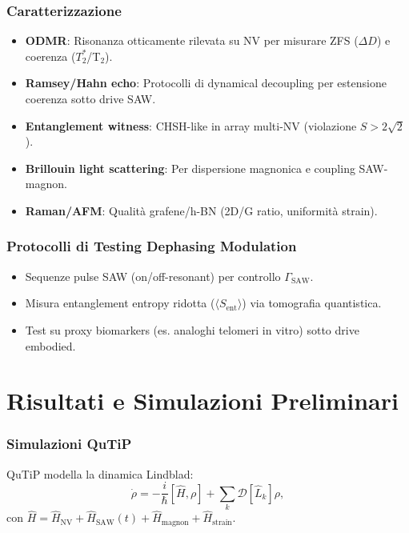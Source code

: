 \documentclass[12pt,a4paper]{article}
\begin{document}
\subsubsection{Caratterizzazione}

\begin{itemize}
    \item \textbf{ODMR}: Risonanza otticamente rilevata su NV per misurare ZFS ($\Delta D$) e coerenza ($T_2^*$/T$_2$).
    \item \textbf{Ramsey/Hahn echo}: Protocolli di dynamical decoupling per estensione coerenza sotto drive SAW.
    \item \textbf{Entanglement witness}: CHSH-like in array multi-NV (violazione $S > 2\sqrt{2}$).
    \item \textbf{Brillouin light scattering}: Per dispersione magnonica e coupling SAW-magnon.
    \item \textbf{Raman/AFM}: Qualità grafene/h-BN (2D/G ratio, uniformità strain).
\end{itemize}

\subsubsection{Protocolli di Testing Dephasing Modulation}

\begin{itemize}
    \item Sequenze pulse SAW (on/off-resonant) per controllo $\Gamma_{\mathrm{SAW}}$.
    \item Misura entanglement entropy ridotta ($\langle S_{\mathrm{ent}} \rangle$) via tomografia quantistica.
    \item Test su proxy biomarkers (es. analoghi telomeri in vitro) sotto drive embodied.
\end{itemize}


\section{Risultati e Simulazioni Preliminari}

\subsubsection{Simulazioni QuTiP}

QuTiP modella la dinamica Lindblad:
\begin{equation}
\dot{\rho} = -\frac{i}{\hbar} [\hat{H}, \rho] + \sum_k \mathcal{D}[\hat{L}_k] \rho,
\end{equation}
con $\hat{H} = \hat{H}_{\mathrm{NV}} + \hat{H}_{\mathrm{SAW}}(t) + \hat{H}_{\mathrm{magnon}} + \hat{H}_{\mathrm{strain}}$.
\end{document}
